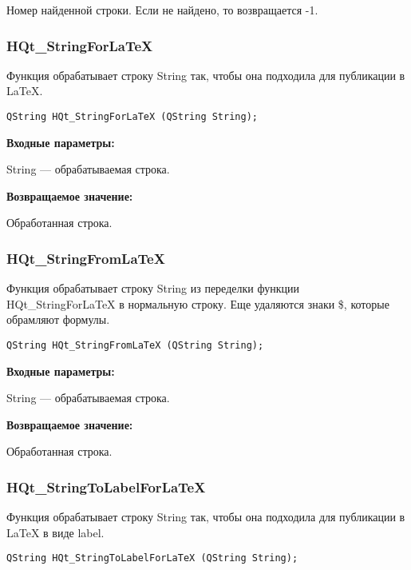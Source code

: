 \documentclass[a4paper,12pt]{article}
\begin{document}
Номер найденной строки. Если не найдено, то возвращается -1.


\subsubsection{HQt\_StringForLaTeX}\label{HQt_StringForLaTeX}

Функция обрабатывает строку String так, чтобы она подходила для публикации в LaTeX.


\begin{lstlisting}[label=code_syntax_HQt_StringForLaTeX,caption=Синтаксис]
QString HQt_StringForLaTeX (QString String);
\end{lstlisting}

\textbf{Входные параметры:}

String --- обрабатываемая строка.

\textbf{Возвращаемое значение:}
 
Обработанная строка.


\subsubsection{HQt\_StringFromLaTeX}\label{HQt_StringFromLaTeX}

Функция обрабатывает строку String из переделки функции HQt\_StringForLaTeX в нормальную строку. Еще удаляются знаки \$, которые обрамляют формулы.


\begin{lstlisting}[label=code_syntax_HQt_StringFromLaTeX,caption=Синтаксис]
QString HQt_StringFromLaTeX (QString String);
\end{lstlisting}

\textbf{Входные параметры:}

String --- обрабатываемая строка.

\textbf{Возвращаемое значение:}
 
Обработанная строка.


\subsubsection{HQt\_StringToLabelForLaTeX}\label{HQt_StringToLabelForLaTeX}

Функция обрабатывает строку String так, чтобы она подходила для публикации в LaTeX в виде label.


\begin{lstlisting}[label=code_syntax_HQt_StringToLabelForLaTeX,caption=Синтаксис]
QString HQt_StringToLabelForLaTeX (QString String);
\end{lstlisting}
\end{document}
